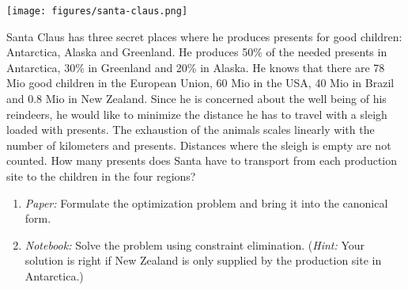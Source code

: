 \begin{exercise}[subtitle={Paper + Notebook}]
\begin{center}
\texttt{[image: figures/santa-claus.png]}
\end{center}

Santa Claus has three secret places where he produces presents for good children: Antarctica, Alaska and Greenland. He produces 50\% of the needed presents in Antarctica, 30\% in Greenland and 20\% in Alaska. He knows that there are 78 Mio good children in the European Union, 60 Mio in the USA, 40 Mio in Brazil and 0.8 Mio in New Zealand. Since he is concerned about the well being of his reindeers, he would like to minimize the distance he has to travel with a sleigh loaded with presents. The exhaustion of the animals scales linearly with the number of kilometers and presents. Distances where the sleigh is empty are not counted. How many presents does Santa have to transport from each production site to the children in the four regions?

\begin{enumerate}[label=\emph{\alph*)}]
\item \textit{Paper:} Formulate the optimization problem and bring it into the canonical form.
\item \textit{Notebook:} Solve the problem using constraint elimination. (\textit{Hint:} Your solution is right if New Zealand is only supplied by the production site in Antarctica.)
\end{enumerate}
\end{exercise}

